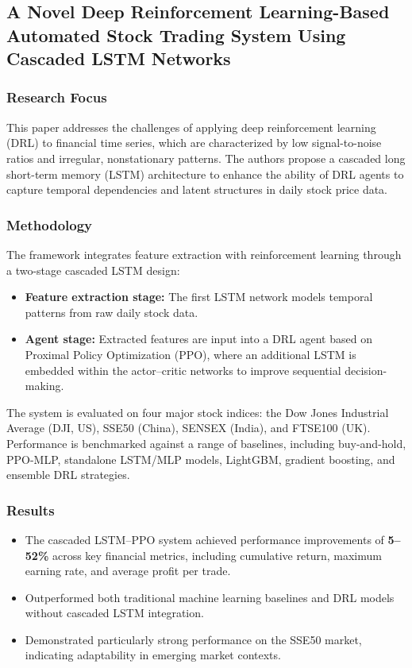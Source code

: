 \documentclass[12pt,a4paper]{report}
\begin{document}
\subsection{A Novel Deep Reinforcement Learning-Based Automated Stock Trading System Using Cascaded LSTM Networks \cite{zou2022cascaded}}

\subsubsection{Research Focus}
This paper addresses the challenges of applying deep reinforcement learning (DRL) to financial time series, which are characterized by low signal-to-noise ratios and irregular, nonstationary patterns. The authors propose a cascaded long short-term memory (LSTM) architecture to enhance the ability of DRL agents to capture temporal dependencies and latent structures in daily stock price data.

\subsubsection{Methodology}
The framework integrates feature extraction with reinforcement learning through a two-stage cascaded LSTM design:
\begin{itemize}
    \item \textbf{Feature extraction stage:} The first LSTM network models temporal patterns from raw daily stock data.  
    \item \textbf{Agent stage:} Extracted features are input into a DRL agent based on Proximal Policy Optimization (PPO), where an additional LSTM is embedded within the actor–critic networks to improve sequential decision-making.  
\end{itemize}

\noindent The system is evaluated on four major stock indices: the Dow Jones Industrial Average (DJI, US), SSE50 (China), SENSEX (India), and FTSE100 (UK). Performance is benchmarked against a range of baselines, including buy-and-hold, PPO-MLP, standalone LSTM/MLP models, LightGBM, gradient boosting, and ensemble DRL strategies.

\subsubsection{Results}
\begin{itemize}
    \item The cascaded LSTM–PPO system achieved performance improvements of \textbf{5–52\%} across key financial metrics, including cumulative return, maximum earning rate, and average profit per trade.  
    \item Outperformed both traditional machine learning baselines and DRL models without cascaded LSTM integration.  
    \item Demonstrated particularly strong performance on the SSE50 market, indicating adaptability in emerging market contexts.  
\end{itemize}
\end{document}
